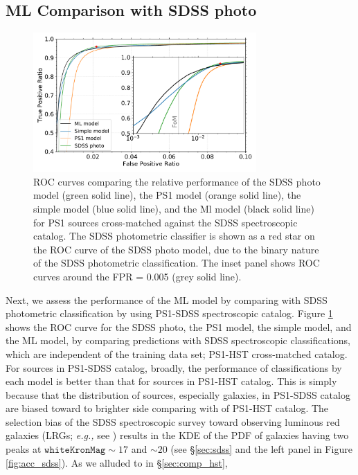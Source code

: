 \documentclass[twocolumn]{aastex62}
\begin{document}
{\subsection{ML Comparison with SDSS photo}
\begin{figure}[t]
 \centering
  \includegraphics[width=3.35in, bb = 0 0 576 360]{./Figures/ROC_curves.pdf}
  \caption{
  ROC curves comparing the relative performance 
  of the SDSS photo model (green solid line), the PS1 model (orange solid line), 
  the simple model (blue solid line), and the Ml model (black solid line) 
  for PS1 sources cross-matched against the SDSS spectroscopic catalog. 
  The SDSS photometric classifier is shown as a red star on the ROC curve of the SDSS photo model, 
  due to the binary nature of the SDSS photometric classification. 
  The inset panel shows ROC curves around the FPR = 0.005 (grey solid line). 
  }
  \label{fig:roc_sdss}
\end{figure}
Next, we assess the performance of the ML model by comparing with SDSS photometric classification 
by using PS1-SDSS spectroscopic catalog. 
Figure \ref{fig:roc_sdss} shows the ROC curve for 
the SDSS photo, the PS1 model, the simple model, and the ML model, 
by comparing predictions with SDSS spectroscopic classifications, 
which are independent of the training data set; PS1-HST cross-matched catalog. 
For sources in PS1-SDSS catalog, broadly, 
the performance of classifications by each model is better than that for sources in PS1-HST catalog. 
This is simply because that the distribution of sources, especially galaxies, in PS1-SDSS catalog 
are biased toward to brighter side comparing with of PS1-HST catalog. 
The selection bias of the SDSS spectroscopic survey 
toward observing luminous red galaxies (LRGs; {\it e.g.,} see \citealt{Eisenstein01}) 
results in the KDE of the PDF of galaxies having two peaks 
at $\mathtt{whiteKronMag} \sim 17$ and $\sim 20$ 
(see \S\ref{sec:sdss} and the left panel in Figure \ref{fig:acc_sdss}). 
As we alluded to in \S\ref{sec:comp_hst}, 
}
\end{document}
